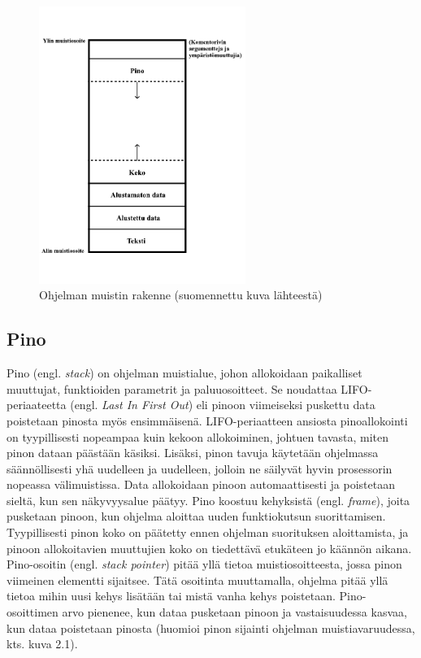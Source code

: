 \begin{figure}[tbh]
{\begin{centering}
\includegraphics[width=0.6\textwidth]{kuvat/muistin_rakenne.pdf}
\par\end{centering}}
\caption{Ohjelman muistin rakenne \cite{mmic2010} (suomennettu kuva lähteestä)}
\end{figure}

\subsection{Pino}

Pino (engl. \textit{stack}) on ohjelman muistialue, johon allokoidaan paikalliset muuttujat, funktioiden parametrit ja paluuosoitteet. Se noudattaa LIFO-periaateetta (engl. \textit{Last In First Out}) eli pinoon viimeiseksi puskettu data poistetaan pinosta myös ensimmäisenä. LIFO-periaatteen ansiosta pinoallokointi on tyypillisesti nopeampaa kuin kekoon allokoiminen, johtuen tavasta, miten pinon dataan päästään käsiksi. Lisäksi, pinon tavuja käytetään ohjelmassa säännöllisesti yhä uudelleen ja uudelleen, jolloin ne säilyvät hyvin prosessorin nopeassa välimuistissa. Data allokoidaan pinoon automaattisesti ja poistetaan sieltä, kun sen näkyvyysalue päätyy. Pino koostuu kehyksistä (engl. \textit{frame}), joita pusketaan pinoon, kun ohjelma aloittaa uuden funktiokutsun suorittamisen. Tyypillisesti pinon koko on päätetty ennen ohjelman suorituksen aloittamista, ja pinoon allokoitavien muuttujien koko on tiedettävä etukäteen jo käännön aikana.\cite{mmic2010}
Pino-osoitin (engl. \textit{stack pointer}) pitää yllä tietoa muistiosoitteesta, jossa pinon viimeinen elementti sijaitsee. Tätä osoitinta muuttamalla, ohjelma pitää yllä tietoa mihin uusi kehys lisätään tai mistä vanha kehys poistetaan. Pino-osoittimen arvo pienenee, kun dataa pusketaan pinoon ja vastaisuudessa kasvaa, kun dataa poistetaan pinosta (huomioi pinon sijainti ohjelman muistiavaruudessa, kts. kuva 2.1).\cite{sasp2006}

